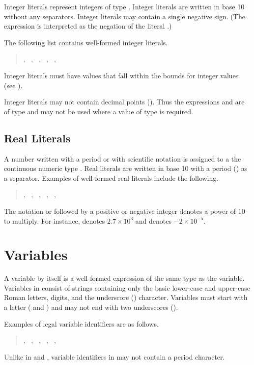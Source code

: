 Integer literals represent integers of type .  Integer
literals are written in base 10 without any separators.  Integer
literals may contain a single negative sign.  (The expression
 is interpreted as the negation of the literal .)

The following list contains well-formed integer literals.
%
\begin{quote}
, \ , \ , \ , 
\ , \ 
\end{quote}
%
Integer literals must have values that fall within the bounds for
integer values (see ).

Integer literals may not contain decimal points ().  Thus the
expressions  and  are of type  and may
not be used where a value of type  is required.

\subsection{Real Literals}

A number written with a period or with scientific notation is assigned
to a the continuous numeric type .  Real literals are
written in base 10 with a period () as a separator.  Examples
of well-formed real literals include the following.
%
\begin{quote}
, \ , \ , \ , \ 
, \ 
\end{quote}
%
The notation  or  followed by a positive or negative
integer denotes a power of 10 to multiply.  For instance, 
denotes $2.7 \times 10^3$ and \code{-2E-5} denotes $-2 \times
10^{-5}$.


\section{Variables}

A variable by itself is a well-formed expression of the same type as
the variable.  Variables in \Stan consist of \ASCII strings containing
only the basic lower-case and upper-case Roman letters, digits, and
the underscore (\code{\_}) character.  Variables must start with a
letter (\code{a--z} and \code{A--Z}) and may not end with two underscores
(\code{\_\_}).

Examples of legal variable identifiers are as follows.
%
\begin{quote}
, 
\ , 
\ ,
\ , 
\ ,
\ 
\end{quote}
%
Unlike in \R and \BUGS, variable identifiers in \Stan may not contain
a period character.  

